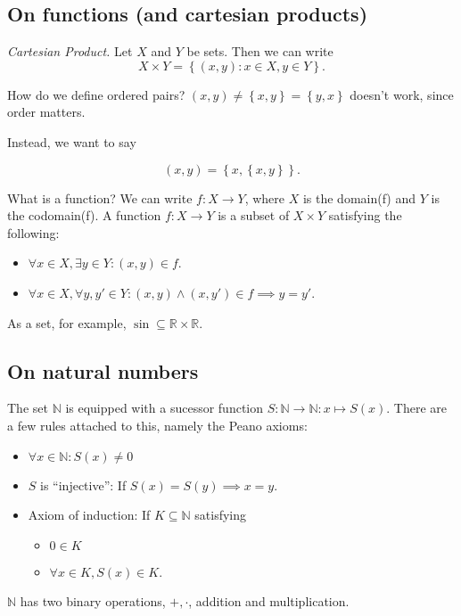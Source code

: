 \documentclass[12pt]{article}
\newcommand{\R}{\mathbb{R}}
\newcommand{\NN}{\mathbb{N}}
\begin{document}
\subsection{On functions (and cartesian products)}

{\it Cartesian Product.} Let $X$ and $Y$ be sets.  Then we can write
\[
  X \times Y = \left\{ (x, y) : x \in X, y \in Y \right\}.
\]

How do we define ordered pairs?  $(x, y) \neq \left\{ x, y \right\} = \left\{ y, x \right\}$ doesn't work, since order matters.

Instead, we want to say

\[
  (x, y) = \left\{ x, \left\{ x, y \right\} \right\}.
\]

What is a function?  We can write $f: X \to Y$, where $X$ is the domain(f) and $Y$ is the codomain(f).  A function $f: X \to Y$ is a subset of $X \times Y$ satisfying the following:

\begin{itemize}
  \item $\forall x \in X, \exists y \in Y: (x, y) \in f$.
  \item  $\forall x \in X, \forall y, y' \in Y: (x, y) \wedge (x, y') \in f \implies y = y'$.
\end{itemize}

As a set, for example, $\sin \subseteq \R \times \R$.

\subsection{On natural numbers}

The set $\NN$ is equipped with a sucessor function $S: \NN \to \NN: x \mapsto S(x)$.  There are a few rules attached to this, namely the Peano axioms:

\begin{itemize}
  \item $\forall x \in \NN: S(x) \neq 0$
  \item $S$ is ``injective'': If $S(x) = S(y) \implies x = y$.
  \item Axiom of induction: If $K \subseteq \NN$ satisfying
    \begin{itemize}
        \item $0 \in K$
        \item $\forall x \in K, S(x) \in K$.
    \end{itemize}
\end{itemize}

$\NN$ has two binary operations, $+, \cdot$, addition and multiplication.
\end{document}
